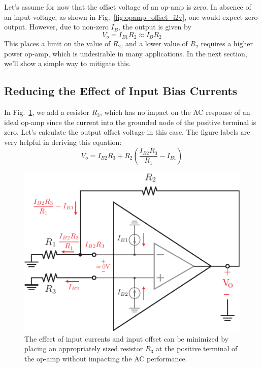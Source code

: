 Let's assume for now that the offset voltage of an op-amp is zero.  In absence of an input voltage, as shown in Fig.~\ref{fig:opamp_offset_i2v}, one would expect zero output.  However, due to non-zero $I_B$, the output is given by
\begin{equation}
      V_o = I_{B1} R_2 \approx I_B R_2 
      \label{eq:off1}
\end{equation}
This places a limit on the value of $R_2$, and a lower value of $R_2$ requires a higher power op-amp, which is undesirable in many applications.  In the next section, we'll show a simple way to mitigate this.
\subsection{Reducing the Effect of Input Bias Currents}
In Fig.~\ref{fig:opamp_offset_reduce}, we add a resistor $R_3$, which has no impact on the AC response of an ideal op-amp since the current into the grounded node of the positive terminal is zero.  Let's calculate the output offset voltage in this case.  The figure labels are very helpful in deriving this equation:
\begin{equation}
      V_o = I_{B2} R_3 + R_2 \left(  \frac{I_{B2}R_3}{R_1} - I_{B1}  \right)
\end{equation}
\begin{figure}[tb]
\begin{center}
\includegraphics[scale=1]{opamp_offset_reduce}
\end{center}
\caption{The effect of input currents and input offset can be minimized by placing an appropriately sized resistor $R_3$ at the positive terminal of the op-amp without impacting the AC performance.} \label{fig:opamp_offset_reduce}
\end{figure}

